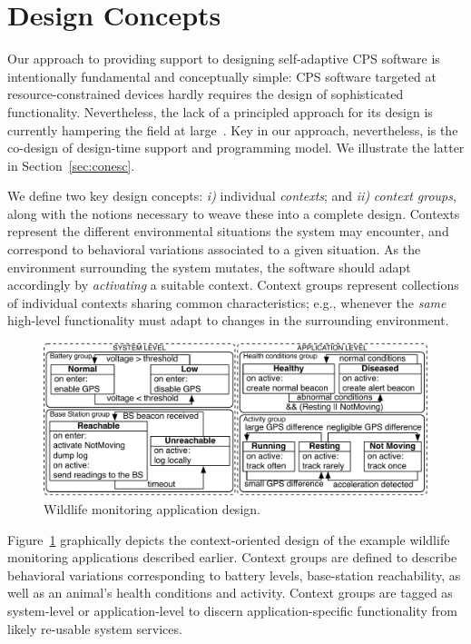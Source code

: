 \section{Design Concepts}
\label{sec:design}

Our approach to providing support to designing self-adaptive CPS
software is intentionally fundamental and conceptually simple: CPS
software targeted at resource-constrained devices hardly requires the
design of sophisticated functionality. Nevertheless, the lack of a
principled approach for its design is currently hampering the field at
large~\cite{gp,cpskeynote}. Key in our approach, nevertheless, is the
co-design of design-time support and programming model. We illustrate
the latter in Section~\ref{sec:conesc}.

We define two key design concepts: \emph{i)} individual
\emph{contexts}; and \emph{ii)} \emph{context groups}, along with the
notions necessary to weave these into a complete design.  Contexts
represent the different environmental situations the system may
encounter, and correspond to behavioral variations associated to a
given situation. As the environment surrounding the system mutates,
the software should adapt accordingly by \emph{activating} a suitable
context. Context groups represent collections of individual contexts
sharing common characteristics; e.g., whenever the \emph{same}
high-level functionality must adapt to changes in the surrounding
environment.

\begin{figure}
\begin{center}
\includegraphics[scale=.45]{imgs/wildlifetracking}
\vspace{-2mm}
\caption{Wildlife monitoring application design.}
  \label{fig:design}
\vspace{-4mm}
\end{center}
\end{figure}

Figure~\ref{fig:design} graphically depicts the context-oriented
design of the example wildlife monitoring applications described
earlier. Context groups are defined to describe behavioral variations
corresponding to battery levels, base-station reachability, as well as
an animal's health conditions and activity. Context groups are tagged
as system-level or application-level to discern application-specific
functionality from likely re-usable system services.

